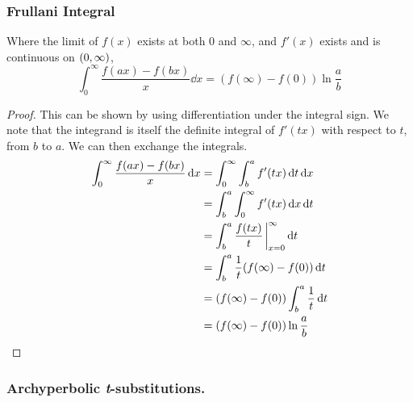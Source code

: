 \subsubsection{Frullani Integral}

\begin{theorem}
Where the limit of \(f(x)\) exists at both 0 and \(\infty\), and \(f'(x)\)
exists and is continuous on \((0, \infty)\),
\begin{equation*}
\int_0^\infty \frac{f(ax) - f(bx)} x \dd{x}
    = (f(\infty) - f(0))\ln \frac ab
\end{equation*}
\end{theorem}
\begin{proof}
This can be shown by using differentiation under the integral sign. We note
that the integrand is itself the definite integral of \(f'(tx)\) with
respect to \(t\), from \(b\) to \(a\). We can then exchange the integrals.
\begin{align*}
\int_0^\infty \frac{f(ax) - f(bx)} x \dd{x} &=
    \int_0^\infty \int_b^a f'(tx) \dd{t} \dd{x} \\
    &= \int_b^a \int_0^\infty f'(tx) \dd{x} \dd{t} \\
    &= \int_b^a \frac{f(tx)}{t}\eval_{x=0}^\infty \dd{t} \\
    &= \int_b^a \frac 1t(f(\infty) - f(0)) \dd{t} \\
    &= (f(\infty) - f(0))\int_b^a \frac 1t \dd{t} \\
    &= (f(\infty) - f(0))\ln \frac ab \qedhere
\end{align*}
\end{proof}

\subsubsection{Archyperbolic \textit t-substitutions.}

